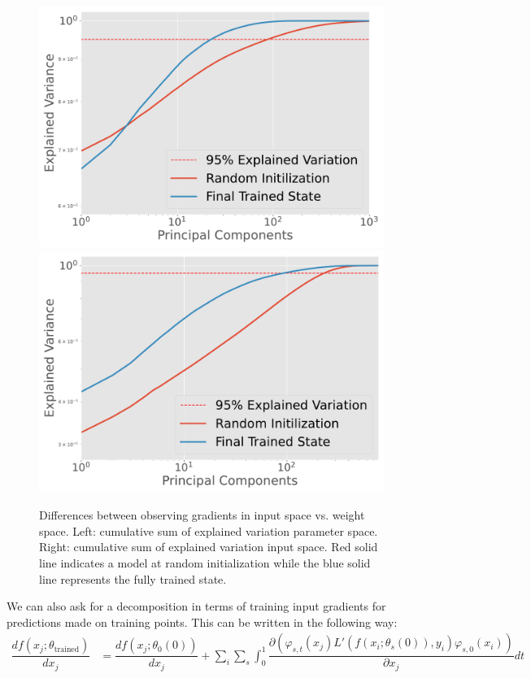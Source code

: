 \begin{figure}[t]
    \centering
    \includegraphics[width=.45\textwidth]{c4a_figures/dimension_change_weightspace.pdf}
    \includegraphics[width=.45\textwidth]{c4a_figures/dimension_change.pdf}
    \caption{Differences between observing gradients in input space vs. weight space. Left: cumulative sum of explained variation parameter space. Right: cumulative sum of explained variation input space. Red solid line indicates a model at random initialization while the blue solid line represents the fully trained state.}
    \label{fig:compare}
\end{figure}
We can also ask for a decomposition in terms of training input gradients for predictions made on training points. This can be written in the following way:
\begin{align}
    \dfrac{df(x_j; \theta_\text{trained})}{dx_j} &= \dfrac{df(x_j; \theta_0(0))}{dx_j} + \sum_i \sum_s \int_0^1 \dfrac{\partial\left(\varphi_{s,t}(x_j) L'(f(x_i; \theta_s(0)), y_i) \varphi_{s, 0}(x_i)\right)}{\partial x_j} dt
\end{align}

